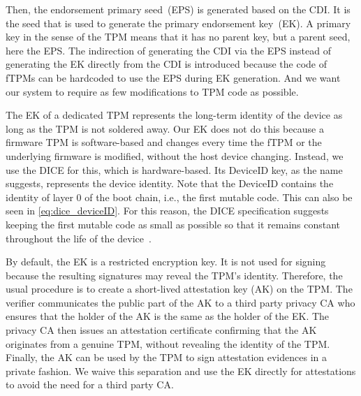 




Then, the endorsement primary seed~(EPS) is generated based on the CDI\@.
It is the seed that is used to generate the primary endorsement key~(EK).
A primary key in the sense of the TPM means that it has no parent key, but a parent seed, here the EPS\@.
The indirection of generating the CDI via the EPS instead of generating the EK directly from the CDI is introduced because the code of fTPMs can be hardcoded to use the EPS during EK generation.
And we want our system to require as few modifications to TPM code as possible.


The EK of a dedicated TPM represents the long-term identity of the device as long as the TPM is not soldered away.
Our EK does not do this because a firmware TPM is software-based and changes every time the fTPM or the underlying firmware is modified, without the host device changing.
Instead, we use the DICE for this, which is hardware-based.
Its DeviceID key, as the name suggests, represents the device identity.
Note that the DeviceID contains the identity of layer 0 of the boot chain, i.e., the first mutable code.
This can also be seen in \autoref{eq:dice_deviceID}.
For this reason, the DICE specification suggests keeping the first mutable code as small as possible so that it remains constant throughout the life of the device~\cite{dice-layering-arch}.


By default, the EK is a restricted encryption key.
It is not used for signing because the resulting signatures may reveal the TPM's identity.
Therefore, the usual procedure is to create a short-lived attestation key (AK) on the TPM\@.
The verifier communicates the public part of the AK to a third party privacy CA who ensures that the holder of the AK is the same as the holder of the EK\@.
The privacy CA then issues an attestation certificate confirming that the AK originates from a genuine TPM, without revealing the identity of the TPM\@.
Finally, the AK can be used by the TPM to sign attestation evidences in a private fashion.
We waive this separation and use the EK directly for attestations to avoid the need for a third party CA\@.


